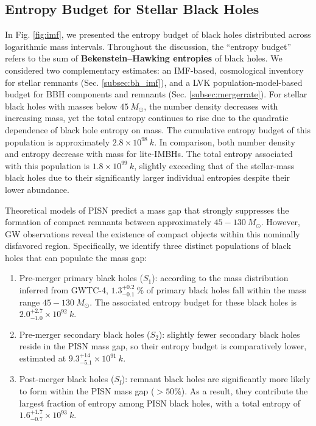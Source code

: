 \documentclass[twocolumn]{aastex631}
\begin{document}
\subsection{Entropy Budget for Stellar Black Holes}
In Fig. \ref{fig:imf}, we presented the entropy budget of black holes distributed across logarithmic mass intervals. Throughout the discussion, the ``entropy budget” refers to the sum of \textbf{Bekenstein–Hawking entropies} of black holes. We considered two complementary estimates: an IMF-based, cosmological inventory for stellar remnants (Sec. \ref{subsec:bh_imf}), and a LVK population-model-based budget for BBH components and remnants (Sec. \ref{subsec:mergerrate}). For stellar black holes with masses below $45~M_\odot$, the number density decreases with increasing mass, yet the total entropy continues to rise due to the quadratic dependence of black hole entropy on mass. The cumulative entropy budget of this population is approximately $2.8 \times 10^{98}~k$. In comparison, both number density and entropy decrease with mass for lite-IMBHs. The total entropy associated with this population is $1.8 \times 10^{99}~k$, slightly exceeding that of the stellar-mass black holes due to their significantly larger individual entropies despite their lower abundance. 

Theoretical models of PISN predict a mass gap that strongly suppresses the formation of compact remnants between approximately $ 45 - 130~M_\odot$. However, GW observations reveal the existence of compact objects within this nominally disfavored region. Specifically, we identify three distinct populations of black holes that can populate the mass gap:

\begin{enumerate}
    \item Pre-merger primary black holes ($S_1$): according to the mass distribution inferred from GWTC-4, $1.3^{+0.2}_{-0.1}~\%$ of primary black holes fall within the mass range $ 45 - 130~M_\odot$. The associated entropy budget for these black holes is $2.0^{+2.7}_{-1.0} \times 10^{92}~k$.
    \item Pre-merger secondary black holes ($S_2$): slightly fewer secondary black holes reside in the PISN mass gap, so their entropy budget is comparatively lower, estimated at $9.3^{+14}_{-5.1} \times 10^{91}~k$.
    \item Post-merger black holes ($S_\mathrm{f}$): remnant black holes are significantly more likely to form within the PISN mass gap ($> 50\%$). As a result, they contribute the largest fraction of entropy among PISN black holes, with a total entropy of $1.6^{+1.7}_{-0.7} \times 10^{93}~k$. 
\end{enumerate}
\end{document}
